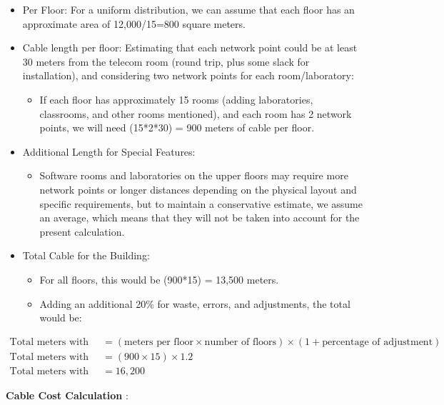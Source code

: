 \documentclass[12pt]{article}
\begin{document}
\begin{itemize}
    \item Per Floor: For a uniform distribution, we can assume that each floor has an approximate area of 12,000/15=800 square meters.
    \item Cable length per floor: Estimating that each network point could be at least 30 meters from the telecom room (round trip, plus some slack for installation), and considering two network points for each room/laboratory:
        \begin{itemize}
            \item If each floor has approximately 15 rooms (adding laboratories, classrooms, and other rooms mentioned), and each room has 2 network points, we will need (15*2*30) = 900 meters of cable per floor.
        \end{itemize}
    \item Additional Length for Special Features:
        \begin{itemize}
            \item Software rooms and laboratories on the upper floors may require more network points or longer distances depending on the physical layout and specific requirements, but to maintain a conservative estimate, we assume an average, which means that they will not be taken into account for the present calculation.
        \end{itemize}
    \item Total Cable for the Building:
        \begin{itemize}
            \item For all floors, this would be (900*15) = 13,500 meters.
            \item Adding an additional 20\% for waste, errors, and adjustments, the total would be: 
        \end{itemize}
\end{itemize}

\begin{align*}
    \text{Total meters with adjustment} &= (\text{meters per floor} \times \text{number of floors}) \times (1 + \text{percentage of adjustment}) \\
    \text{Total meters with adjustment} &= (900 \times 15) \times 1.2 \\
    \text{Total meters with adjustment} &= 16,200
\end{align*}

\textbf{Cable Cost Calculation} \cite{truecable}:
\end{document}
